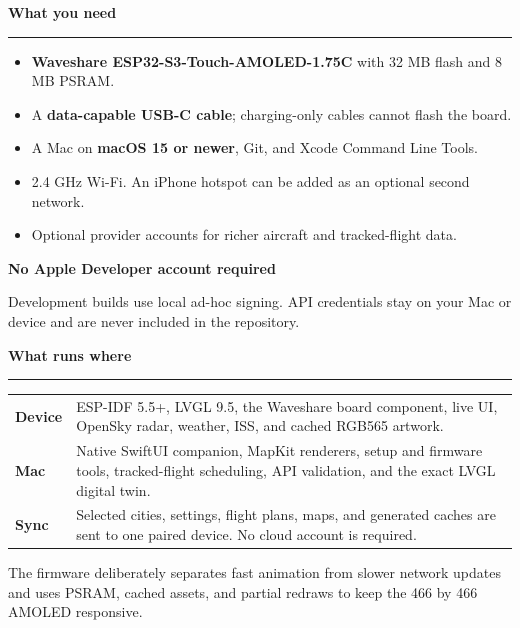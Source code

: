 \documentclass[10pt,letterpaper]{article}
\newcommand{\SectionTitle}[1]{%
  {\fontsize{14.5}{17}\selectfont\bfseries\color{Text}#1\par}%
  \vspace{2pt}\textcolor{Line}{\rule{\linewidth}{0.55pt}}\vspace{4pt}%
}
\newcommand{\SmallTitle}[1]{%
  {\fontsize{9.3}{11}\selectfont\bfseries\color{Text}#1\par}%
}
\begin{document}
\begin{minipage}[t]{0.47\linewidth}
  \SectionTitle{What you need}
  \begin{itemize}[leftmargin=0.18in,itemsep=2.5pt,topsep=1pt]
    \item \textbf{Waveshare ESP32-S3-Touch-AMOLED-1.75C} with 32 MB flash and 8 MB PSRAM.
    \item A \textbf{data-capable USB-C cable}; charging-only cables cannot flash the board.
    \item A Mac on \textbf{macOS 15 or newer}, Git, and Xcode Command Line Tools.
    \item 2.4 GHz Wi-Fi. An iPhone hotspot can be added as an optional second network.
    \item Optional provider accounts for richer aircraft and tracked-flight data.
  \end{itemize}
  \vspace{3pt}
  \SmallTitle{No Apple Developer account required}
  {\fontsize{7.6}{9.5}\selectfont\color{Muted}
    Development builds use local ad-hoc signing. API credentials stay on
    your Mac or device and are never included in the repository.\par}
\end{minipage}\hfill
\begin{minipage}[t]{0.47\linewidth}
  \SectionTitle{What runs where}
  \begin{tabularx}{\linewidth}{@{}p{0.76in}X@{}}
    \textcolor{Accent}{\bfseries Device} &
      ESP-IDF 5.5+, LVGL 9.5, the Waveshare board component, live UI,
      OpenSky radar, weather, ISS, and cached RGB565 artwork.\\[5pt]
    \textcolor{Accent}{\bfseries Mac} &
      Native SwiftUI companion, MapKit renderers, setup and firmware tools,
      tracked-flight scheduling, API validation, and the exact LVGL digital twin.\\[5pt]
    \textcolor{Accent}{\bfseries Sync} &
      Selected cities, settings, flight plans, maps, and generated caches are
      sent to one paired device. No cloud account is required.\\
  \end{tabularx}
  \vspace{4pt}
  {\fontsize{7.4}{9.3}\selectfont\color{Muted}
    The firmware deliberately separates fast animation from slower network
    updates and uses PSRAM, cached assets, and partial redraws to keep the
    466 by 466 AMOLED responsive.\par}
\end{minipage}
\end{document}
